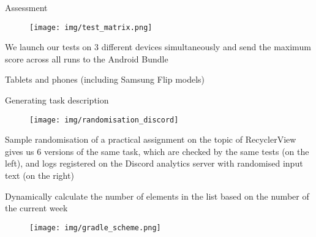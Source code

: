 \documentclass{beamer}%
\begin{document}
\begin{frame}{Assessment}
\begin{changemargin}
\footnotesize


\begin{figure}[h]
\begin{minipage}[h]{0.9\linewidth}
\hbox{\hspace{-2em}\texttt{[image: img/test\_matrix.png]}}
\end{minipage}
\end{figure}

We launch our tests on 3 different devices simultaneously and send the maximum score across all runs to the Android Bundle

Tablets and phones (including Samsung Flip models)

\end{changemargin}
\end{frame}
\begin{frame}{Generating task description}
\begin{changemargin}
\footnotesize

\begin{figure}[h]
\begin{minipage}[h]{0.9\linewidth}
\hbox{\hspace{-2em}\texttt{[image: img/randomisation\_discord]}}
\end{minipage}
\end{figure}

Sample randomisation of a practical assignment on the topic of RecyclerView gives us 6 versions of the same task, which are checked by the same tests (on the left), and logs registered on the Discord analytics server with randomised input text (on the right)


Dynamically calculate the number of elements in the list based on the number of the current week
\end{changemargin}
\end{frame}
\begin{frame}{}
\begin{changemargin}
\footnotesize

\begin{figure}[h]
\begin{minipage}[h]{0.92\linewidth}
\hbox{\hspace{-2em}\texttt{[image: img/gradle\_scheme.png]}}
\end{minipage}
\end{figure}

\end{changemargin}
\end{frame}
\end{document}
